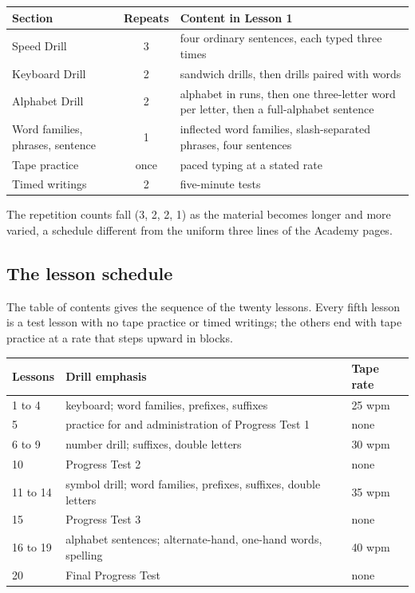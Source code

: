 \begin{center}
\begin{tabular}{@{}lc p{7.2cm}@{}}
\toprule
Section & Repeats & Content in Lesson 1 \\
\midrule
Speed Drill & 3 & four ordinary sentences, each typed three times \\
Keyboard Drill & 2 & sandwich drills, then drills paired with words \\
Alphabet Drill & 2 & alphabet in runs, then one three-letter word per letter, then a full-alphabet sentence \\
Word families, phrases, sentence & 1 & inflected word families, slash-separated phrases, four sentences \\
Tape practice & once & paced typing at a stated rate \\
Timed writings & 2 & five-minute tests \\
\bottomrule
\end{tabular}
\end{center}

The repetition counts fall (3, 2, 2, 1) as the material becomes longer and more varied, a schedule different from the uniform three lines of the Academy pages.

\subsection{The lesson schedule}

The table of contents gives the sequence of the twenty lessons. Every fifth lesson is a test lesson with no tape practice or timed writings; the others end with tape practice at a rate that steps upward in blocks.

\begin{center}
\begin{tabular}{@{}lll@{}}
\toprule
Lessons & Drill emphasis & Tape rate \\
\midrule
1 to 4 & keyboard; word families, prefixes, suffixes & 25 wpm \\
5 & practice for and administration of Progress Test 1 & none \\
6 to 9 & number drill; suffixes, double letters & 30 wpm \\
10 & Progress Test 2 & none \\
11 to 14 & symbol drill; word families, prefixes, suffixes, double letters & 35 wpm \\
15 & Progress Test 3 & none \\
16 to 19 & alphabet sentences; alternate-hand, one-hand words, spelling & 40 wpm \\
20 & Final Progress Test & none \\
\bottomrule
\end{tabular}
\end{center}

